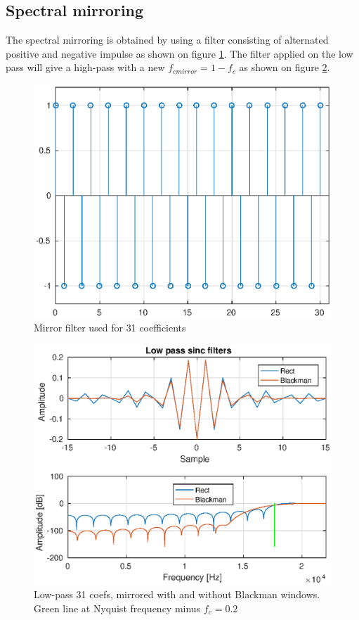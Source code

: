 \documentclass[twoside,twocolumn]{article}
\begin{document}
\subsection{Spectral mirroring}

The spectral mirroring is obtained by using a filter consisting of alternated positive and negative impulse as shown on figure \ref{mirrorfilt}. The filter applied on the low pass will give a high-pass with a new $f_{cmirror}=1-f_c$ as shown on figure \ref{mirrored}.
\begin{figure}[h!]
	\centering
	\includegraphics[scale=0.5]{./images/mirrorfilt.eps}
	\caption{Mirror filter used for 31 coefficients}
	\label{mirrorfilt}
\end{figure}

\begin{figure}[h!]
	\centering
	\includegraphics[scale=0.5]{./images/mirrored.eps}
	\caption{Low-pass 31 coefs, mirrored with and without Blackman windows. Green line at Nyquist frequency minus $f_c=0.2$}
	\label{mirrored}
\end{figure}
\end{document}
